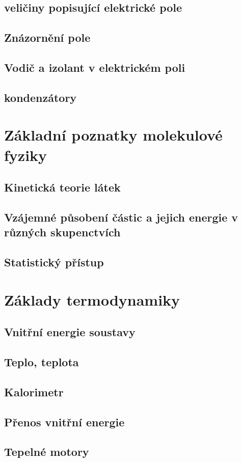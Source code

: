 \documentclass[titlepage]{book}
\begin{document}
\section{veličiny popisující elektrické pole}
\section{Znázornění pole}
\section{Vodič a izolant v elektrickém poli}
\section{kondenzátory}
\chapter{Základní poznatky molekulové fyziky}
\section{Kinetická teorie látek}
\section{Vzájemné působení částic a jejich energie v různých skupenctvích}
\section{Statistický přístup}
\chapter{Základy termodynamiky}
\section{Vnitřní energie soustavy}
\section{Teplo, teplota}
\section{Kalorimetr}
\section{Přenos vnitřní energie}
\section{Tepelné motory}
\end{document}
